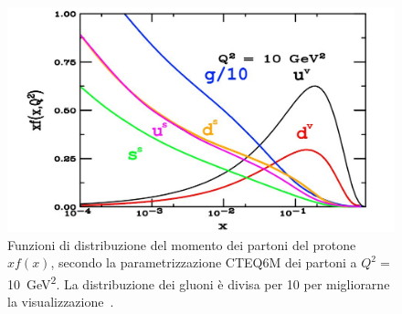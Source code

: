         \begin{figure}[h]
            \centering
            \includegraphics[width=0.7\linewidth]{res/fig/1-chapter/6-pdf-momentum-proton.jpg}
            \caption{Funzioni di distribuzione del momento dei partoni del protone $xf(x)$, secondo la parametrizzazione CTEQ6M dei partoni a $Q^2 =$ \qty{10}{\giga \eV^2}. La distribuzione dei gluoni è divisa per 10 per migliorarne la visualizzazione~\cite{Fusconi_2022}.}
            \label{fig:6-pdf-momentum-proton}
        \end{figure}

\newpage


